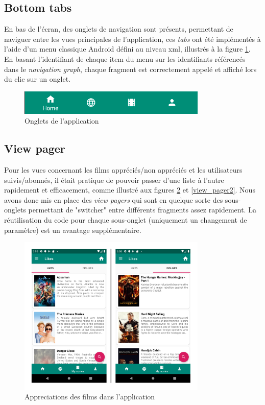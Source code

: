 \subsection{Bottom tabs}
En bas de l'écran, des onglets de navigation sont présents, permettant de naviguer entre les vues principales de l'application, ces \textit{tabs} ont été implémentés à l'aide d'un menu classique Android défini au niveau \acrshort{xml}, illustrés à la figure \ref{tabs}. En basant l'identifiant de chaque item du menu sur les identifiants référencés dans le \textit{navigation graph}, chaque fragment est correctement appelé et affiché lors du clic sur un onglet.

\begin{figure}
    \begin{center}
        \includegraphics[width=0.8\textwidth]{img/screenshots/Bottom_Tabs.png}
    \end{center}
    \caption{Onglets de l'application}
    \label{tabs}
\end{figure}

\subsection{View pager}

Pour les vues concernant les films appréciés/non appréciés et les utilisateurs suivis/abonnés, il était pratique de pouvoir passer d'une liste à l'autre rapidement et efficacement, comme illustré aux figures \ref{view_pager1} et \ref{view_pager2}. Nous avons donc mis en place des \textit{view pagers} qui sont en quelque sorte des sous-onglets permettant de "switcher" entre différents fragments assez rapidement. La réutilisation du code pour chaque sous-onglet (uniquement un changement de paramètre) est un avantage supplémentaire.
\begin{figure}
    \begin{center}
        \includegraphics[width=0.8\textwidth]{img/screenshots/ViewPager1.png}
    \end{center}
    \caption{Appreciations des films dans l'application}
    \label{view_pager1}
\end{figure}

